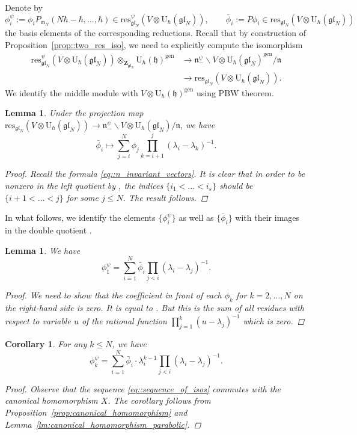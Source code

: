 \documentclass[10pt,a4paper]{amsart}
\numberwithin{equation}{section}
\newtheorem{Corollary}[Theorem]{Corollary}
\newtheorem{Lemma}[Theorem]{Lemma}
\newcommand{\U}{\mathrm{U}_{\hbar}}
\newcommand{\Z}{\mathbf{Z}}
\newcommand{\h}{\mathfrak{h}}
\newcommand{\n}{\mathfrak{n}}
\newcommand{\m}{\mathfrak{m}}
\newcommand{\gen}{\mathrm{gen}}
\newcommand{\res}{\mathrm{res}}
\newcommand{\gl}{\mathfrak{gl}}
\begin{document}
	Denote by
	\[
	\phi_i^{\psi} := \phi_i P_{\m_N}(N\hbar-\hbar,\dots,\hbar) \in \res^{\psi}_{\gl_N}(V \otimes \U(\gl_N)), \qquad \bar{\phi}_i := P \phi_i \in \res_{\gl_N}(V \otimes \U(\gl_N))
	\]
	the basis elements of the corresponding reductions. Recall that by construction of Proposition~\ref{prop::two_res_iso}, we need to explicitly compute the isomorphism
	\begin{align}
		\res^{\psi}_{\gl_N}(V \otimes \U(\gl_N)) \otimes_{\Z_{\gl_N}} \U(\h)^{\gen}& \rightarrow \n_-^{\psi} \backslash V \otimes \U(\gl_N)^{\gen} / \n\nonumber \\
&\rightarrow \res_{\gl_N}(V \otimes \U(\gl_N)).\label{eq::sequence_of_isos}
	\end{align}
	We identify the middle module with $V \otimes \U(\h)^{\gen}$ using PBW theorem.
	
	\begin{Lemma}
		Under the projection map $\res_{\gl_N}(V \otimes \U(\gl_N)) \rightarrow \n_-^{\psi} \backslash V \otimes \U(\gl_N) / \n$, we have
		\[
		\bar{\phi}_i \mapsto \sum\limits_{j=i}^{N} \phi_j \prod_{k=i+1}^j (\lambda_i-\lambda_k)^{-1}.
		\]
		\begin{proof}
			Recall the formula \eqref{eq::n_invariant_vectors}. It is clear that in order to be nonzero in the left quotient by \smash{$\n_-^{\psi}$}, the indices $\{i_1 < \dots < i_s\}$ should be $\{i+1 < \dots < j\}$ for some $j \leq N$. The result follows.
		\end{proof}
	\end{Lemma}
	
	In what follows, we identify the elements $\bigl\{\phi_i^{\psi}\bigr\}$ as well as $\bigl\{\bar{\phi}_i\bigr\}$ with their images in the double quotient \smash{$\n_-^{\psi} \backslash V \otimes \U(\gl_N) /\n$}.
	
	\begin{Lemma}
		We have
		\[
		\phi_1^{\psi} = \sum\limits_{i=1}^N \bar{\phi}_i \prod_{j<i} (\lambda_i - \lambda_j)^{-1}.
		\]
		\begin{proof}
			We need to show that the coefficient in front of each $\phi_k$ for $k=2,\dots,N$ on the right-hand side is zero. It is equal to . But this is the sum of all residues with respect to variable $u$ of the rational function $\prod_{j=1}^k (u-\lambda_j)^{-1}$ which is zero.
		\end{proof}
	\end{Lemma}
	
	\begin{Corollary}
		For any $k\leq N$, we have
		\[
		\phi_k^{\psi} = \sum\limits_{i=1}^N \bar{\phi}_i \cdot \lambda_i^{k-1} \prod_{j<i} (\lambda_i - \lambda_j)^{-1}.
		\]
		\begin{proof}
			Observe that the sequence \eqref{eq::sequence_of_isos} commutes with the canonical homomorphism $X$. The corollary follows from Proposition~\ref{prop:canonical_homomorphism} and Lemma~\ref{lm:canonical_homomorphism_parabolic}.
		\end{proof}
	\end{Corollary}
	
\end{document}
